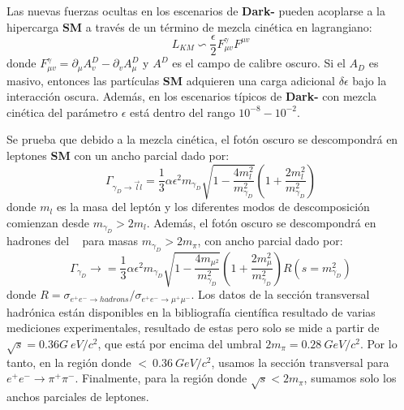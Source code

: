 Las nuevas fuerzas ocultas en los escenarios de \textbf{Dark-\SUSY} pueden acoplarse a la hipercarga \textbf{SM} a través de un término de mezcla cinética en lagrangiano:
\begin{equation}
\label{an-15-455:ec3}
L_{KM}\backsim \dfrac{\epsilon}{2} F_{\mu v}^{\gamma} F^{\mu v}
\end{equation}
donde $F_{\mu v}^{\gamma} = \partial_\mu A_v^{D} -\partial_v A_\mu^D$ y $A^D$ es el campo de calibre oscuro. Si el $A_D$ es masivo, entonces las partículas \textbf{SM} adquieren una carga adicional $\delta \epsilon$ bajo la interacción oscura. Además, en los escenarios típicos de \textbf{Dark-\SUSY} con mezcla cinética del parámetro $\epsilon$ está dentro del rango $10^{-8}-10^{-2}$. 

Se prueba que debido a la mezcla cinética, el fotón oscuro se descompondrá en leptones \textbf{SM} con un ancho parcial dado por:
\begin{equation}
\label{an-15-455:ec4}
\Gamma_{\gamma_D \rightarrow \vec{l}l} = \dfrac{1}{3}\alpha \epsilon^2 m_{\gamma_D} \sqrt{1- \dfrac{4m_l^2}{m_{\gamma_D}^2}}
\left( 1 + \dfrac{2m_l^2}{m_{\gamma_D}^2}\right) 
\end{equation}
donde $m_l$ es la masa del leptón y los diferentes modos de descomposición comienzan desde $m_{\gamma_D} > 2 m_l$. Además, el fotón oscuro se descompondrá en hadrones del \ME ~ para masas $m_{\gamma_D} > 2 m_\pi$, con ancho parcial dado por:
\begin{equation}
\label{an-15-455:ec5}
\Gamma_{\gamma_D} \rightarrow = \dfrac{1}{3} \alpha \epsilon^2 m_{\gamma_D} \sqrt{1 -\dfrac{4 m_{\mu^2}}{m_{\gamma_D}^2}} \left( 1 + \dfrac{2 m_\mu^2}{m_{\gamma_D}^2}\right) R(s = m_{\gamma_D}^2)
\end{equation}
donde $R = \sigma_{e^+ e^- \rightarrow hadrons} / \sigma_{e^+ e^- \rightarrow \mu^+ \mu^-}$. Los datos de la sección transversal hadrónica están disponibles en la bibliografía científica resultado de varias mediciones experimentales, resultado de estas pero solo se mide a partir de $\sqrt{s}= 0.36G ~ eV / c^2$, que está por encima del umbral $2 m_\pi = 0.28~GeV / c^2$. Por lo tanto, en la región donde $ < ~ 0.36~GeV / c^2$, usamos la sección transversal para $e^+e^- \rightarrow \pi^+\pi^-$. Finalmente, para la región donde $\sqrt{s} < 2 m_\pi$, sumamos solo los anchos parciales de leptones.

